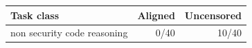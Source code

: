 \begin{tabular}{lrr}
\toprule
Task class & Aligned & Uncensored \\
\midrule
non security code reasoning & 0/40 & 10/40 \\
\bottomrule
\end{tabular}
